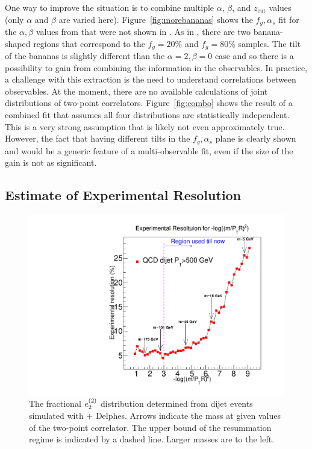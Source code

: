 One way to improve the situation is to combine multiple $\alpha$, $\beta$, and $z_\text{cut}$ values (only $\alpha$ and $\beta$ are varied here).
%
Figure~\ref{fig:morebananas} shows the $f_g,\alpha_s$ fit for the $\alpha,\beta$ values from  that were not shown in .
%
As in , there are two banana-shaped regions that correspond to the $f_g=20\%$ and $f_g=80\%$ samples.
%
The tilt of the bananas is slightly different than the $\alpha=2, \beta=0$ case and so there is a possibility to gain from combining the information in the observables.
%
In practice, a challenge with this extraction is the need to understand correlations between observables.
%
At the moment, there are no available calculations of joint distributions of two-point correlators.
%
Figure~\ref{fig:combo} shows the result of a combined fit that assumes all four distributions are statistically independent.
%
This is a very strong assumption that is likely not even approximately true.
%
However, the fact that having different tilts in the $f_g,\alpha_s$ plane is clearly shown and would be a generic feature of a multi-observable fit, even if the size of the gain is not as significant. 


\subsection{Estimate of Experimental Resolution}
\label{sec:resolution}

\begin{figure}[t]
\begin{center}
\includegraphics[width = 0.49\columnwidth]{figures/experimentaldemo/Resolution_plot_logrho_updated.pdf}
\end{center}
\caption{The fractional $e_{2}^{(2)}$ distribution determined from dijet events simulated with \pythia + Delphes.  Arrows indicate the mass at given values of the two-point correlator.  The upper bound of the resummation regime is indicated by a dashed line.  Larger masses are to the left.}
\label{fig:resolution}
\end{figure}

